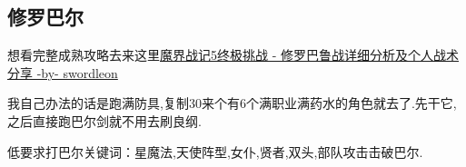 	\subsection{修罗巴尔}

	想看完整成熟攻略去来这里\href{http://tieba.baidu.com/p/3949061316}{魔界战记5终极挑战 - 修罗巴鲁战详细分析及个人战术分享 -by- swordleon }

	我自己办法的话是跑满防具,复制30来个有6个满职业满药水的角色就去了.先干它,之后直接跑巴尔剑就不用去刷良纲.

	低要求打巴尔关键词：星魔法,天使阵型,女仆,贤者,双头,部队攻击击破巴尔.




